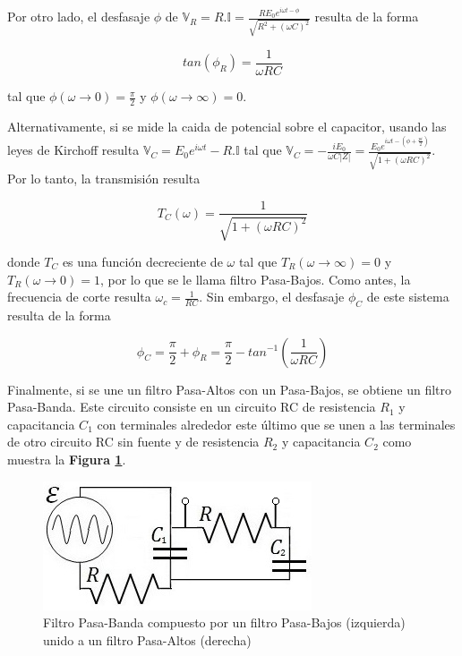 \documentclass[11pt,a4paper]{article}
\begin{document}
Por otro lado, el desfasaje $\phi$ de $\mathbb{V}_R = R.\mathbb{I} = \frac{RE_0e^{i\omega t - \phi}}{\sqrt{R^2+(\omega C)^2}}$ resulta de la forma

\begin{equation}
tan(\phi_R) = \frac{1}{\omega R C}
\label{des_PBaj}
\end{equation}

tal que $\phi(\omega \rightarrow 0) = \frac{\pi}{2}$ y $\phi(\omega \rightarrow \infty) = 0$.

Alternativamente, si se mide la caida de potencial sobre el capacitor, usando las leyes de Kirchoff resulta $\mathbb{V}_C = E_0e^{i\omega t} - R.\mathbb{I}$ tal que $\mathbb{V}_C = -\frac{iE_0}{\omega C|Z|} = \frac{E_0e^{i\omega t -(\phi+\frac{pi}{2})}}{\sqrt{1+(\omega RC)^2}}$. Por lo tanto, la transmisión resulta

\begin{equation}
T_C(\omega) = \frac{1}{\sqrt{1+(\omega RC)^2}}
\label{trans_PA}
\end{equation}

donde $T_C$ es una función decreciente de $\omega$ tal que $T_R(\omega \rightarrow \infty) = 0$ y $T_R(\omega \rightarrow 0) = 1$, por lo que se le llama filtro Pasa-Bajos. Como antes, la frecuencia de corte resulta $\omega_c = \frac{1}{RC}$. Sin embargo, el desfasaje $\phi_C$ de este sistema resulta de la forma 

\begin{equation}
\phi_C = \frac{\pi}{2}+\phi_R = \frac{\pi}{2} - tan^{-1}(\frac{1}{\omega R C})
\label{des_PA}
\end{equation}

Finalmente, si se une un filtro Pasa-Altos con un Pasa-Bajos, se obtiene un filtro Pasa-Banda. Este circuito consiste en un circuito RC de resistencia $R_1$ y capacitancia $C_1$ con terminales alrededor este último que se unen a las terminales de otro circuito RC sin fuente y de resistencia $R_2$ y capacitancia $C_2$ como muestra la \textbf{Figura \ref{fig:intro}}.

\begin{figure}[h]
\centering
\includegraphics[scale=0.75]{Figura_Intro}
  \caption{Filtro Pasa-Banda compuesto por un filtro Pasa-Bajos (izquierda) unido a un filtro Pasa-Altos (derecha)}
  \label{fig:intro}
\end{figure}
\end{document}
